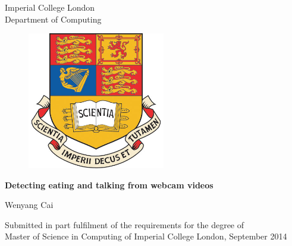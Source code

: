 \begin{titlepage}
\begin{center}
{
  \Large  Imperial College London \\ Department of Computing
  \rm
  \vskip 1in
  \begin{figure}[ht]
  \centering
  \includegraphics[width=60mm]{imgs/ImperialCrest.jpg}
  \end{figure}
  \vskip 0.7in
  \Large \bf Detecting eating and talking from webcam videos \par
}
\vskip 0.2in
\par
{\Large Wenyang Cai}
\vskip 3in
\par
Submitted in part fulfilment of the requirements for the degree of 
\\
Master of Science in Computing of Imperial College London, September 2014
\vfil
\end{center}
\end{titlepage}